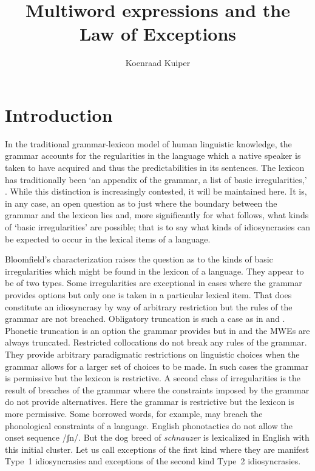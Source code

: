\documentclass[output=paper]{langsci/langscibook}
\author{Koenraad Kuiper\affiliation{University of Canterbury, New Zealand}}
\title{Multiword expressions and the Law of Exceptions}
\begin{document}
\section{Introduction}

In the traditional grammar-lexicon model of human linguistic knowledge, the grammar accounts for the regularities in the language which a native speaker is taken to have acquired and thus the predictabilities in its sentences. The lexicon has traditionally been ‘an appendix of the grammar, a list of basic irregularities,’ \citep[274]{Bloomfield1933}. While this distinction is increasingly contested, it will be maintained here. It is, in any case, an open question as to just where the boundary between the grammar and the lexicon lies and, more significantly for what follows, what kinds of ‘basic irregularities’ are possible; that is to say what kinds of idiosyncrasies can be expected to occur in the lexical items of a language. 

Bloomfield’s characterization raises the question as to the kinds of basic irregularities which might be found in the lexicon of a language. They appear to be of two types. Some irregularities are exceptional in cases where the grammar provides options but only one is taken in a particular lexical item. That does constitute an idiosyncrasy by way of arbitrary restriction but the rules of the grammar are not breached. Obligatory truncation  is such a case as in  and . Phonetic truncation is an option the grammar provides but in  and  the MWEs are always truncated. Restricted collocations  do not break any rules of the grammar. They provide arbitrary paradigmatic restrictions on linguistic choices when the grammar allows for a larger set of choices to be made. In such cases the grammar is permissive but the lexicon is restrictive. A second class of irregularities is the result of breaches of the grammar where the constraints imposed by the grammar do not provide alternatives. Here the grammar is restrictive but the lexicon is more permissive. Some borrowed words, for example, may breach the phonological constraints of a language.  English  phonotactics do not allow the onset sequence /ʃn/. But the dog breed of \textit{schnauzer} is lexicalized in English with this initial cluster. Let us call exceptions of the first kind where they are manifest Type~1 idiosyncrasies and exceptions of the second kind Type~2 idiosyncrasies.
\end{document}
